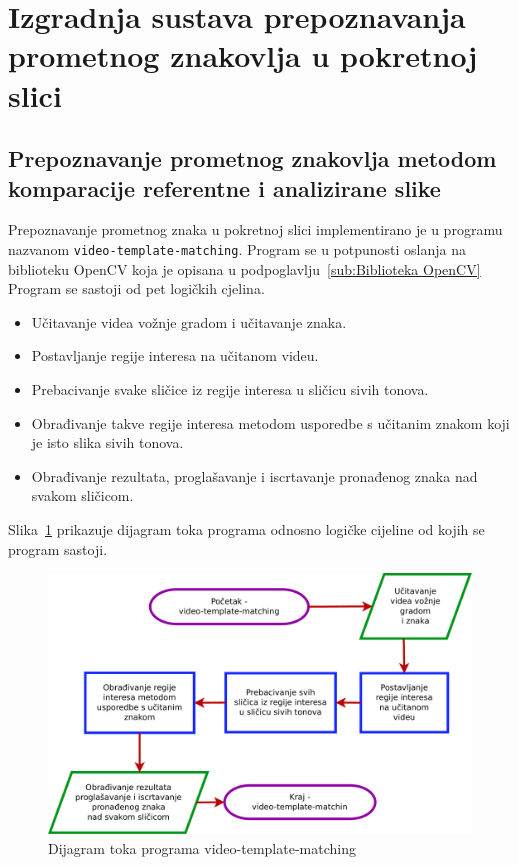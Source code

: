 \newpage
\setcounter{figure}{0}

\section{Izgradnja sustava prepoznavanja prometnog znakovlja u pokretnoj slici} %
\label{sec:Prepoznavanje prometnog}

\subsection{Prepoznavanje prometnog znakovlja metodom komparacije referentne i analizirane slike} %
\label{sub:Prepoznavanje prometnog}

Prepoznavanje prometnog znaka u pokretnoj slici implementirano je u
programu nazvanom \texttt{video-template-matching}. Program se u
potpunosti oslanja na biblioteku OpenCV koja je opisana u
podpoglavlju~\ref{sub:Biblioteka OpenCV} Program se sastoji od pet
logičkih cjelina.

\begin{itemize}
    \item Učitavanje videa vožnje gradom i učitavanje znaka.
    \item Postavljanje regije interesa na učitanom videu.
    \item Prebacivanje svake sličice iz regije interesa u sličicu sivih
        tonova. 
    \item Obrađivanje takve regije interesa metodom usporedbe s učitanim
        znakom koji je isto slika sivih tonova.
    \item Obrađivanje rezultata, proglašavanje i iscrtavanje pronađenog
        znaka nad svakom sličicom.
\end{itemize}

Slika~\ref{fig:dijagramtoka.pdf} prikazuje dijagram toka programa
odnosno logičke cijeline od kojih se program sastoji.

\begin{figure}[h]
\centering
\includegraphics[scale=0.4]{figures/dijagramtoka.pdf}
\caption{Dijagram toka programa video-template-matching}
\label{fig:dijagramtoka.pdf}
\end{figure}



